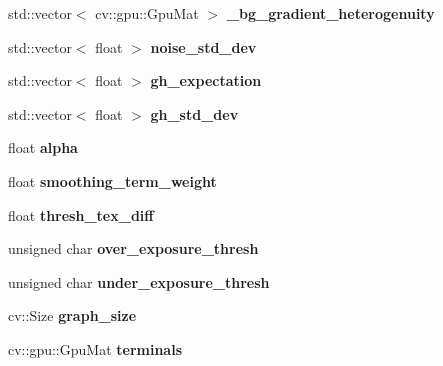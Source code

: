 \begin{DoxyCompactItemize}
std\+::vector$<$ cv\+::gpu\+::\+Gpu\+Mat $>$ {\bfseries \+\_\+bg\+\_\+gradient\+\_\+heterogenuity}
\item 
\hypertarget{classskl_1_1gpu_1_1_tex_cut_aa661cd66555f522bff787aaca52c354b}{}\label{classskl_1_1gpu_1_1_tex_cut_aa661cd66555f522bff787aaca52c354b} 
std\+::vector$<$ float $>$ {\bfseries noise\+\_\+std\+\_\+dev}
\item 
\hypertarget{classskl_1_1gpu_1_1_tex_cut_a4813022abf9a9f4305f7b73527f6b514}{}\label{classskl_1_1gpu_1_1_tex_cut_a4813022abf9a9f4305f7b73527f6b514} 
std\+::vector$<$ float $>$ {\bfseries gh\+\_\+expectation}
\item 
\hypertarget{classskl_1_1gpu_1_1_tex_cut_ab741d9765e1899ab326795b940f6a618}{}\label{classskl_1_1gpu_1_1_tex_cut_ab741d9765e1899ab326795b940f6a618} 
std\+::vector$<$ float $>$ {\bfseries gh\+\_\+std\+\_\+dev}
\item 
\hypertarget{classskl_1_1gpu_1_1_tex_cut_a5600fc961ecda5a4527bfc4bdecc0d4b}{}\label{classskl_1_1gpu_1_1_tex_cut_a5600fc961ecda5a4527bfc4bdecc0d4b} 
float {\bfseries alpha}
\item 
\hypertarget{classskl_1_1gpu_1_1_tex_cut_a40fa380adc2ccd67a56219d3796e5b8d}{}\label{classskl_1_1gpu_1_1_tex_cut_a40fa380adc2ccd67a56219d3796e5b8d} 
float {\bfseries smoothing\+\_\+term\+\_\+weight}
\item 
\hypertarget{classskl_1_1gpu_1_1_tex_cut_aa7a35234ff57bb949ef19aac21830481}{}\label{classskl_1_1gpu_1_1_tex_cut_aa7a35234ff57bb949ef19aac21830481} 
float {\bfseries thresh\+\_\+tex\+\_\+diff}
\item 
\hypertarget{classskl_1_1gpu_1_1_tex_cut_ab48e26d5aa9049d6b9cd54f3fb155cef}{}\label{classskl_1_1gpu_1_1_tex_cut_ab48e26d5aa9049d6b9cd54f3fb155cef} 
unsigned char {\bfseries over\+\_\+exposure\+\_\+thresh}
\item 
\hypertarget{classskl_1_1gpu_1_1_tex_cut_ad21505b70952f3ff98185d9b188ece6e}{}\label{classskl_1_1gpu_1_1_tex_cut_ad21505b70952f3ff98185d9b188ece6e} 
unsigned char {\bfseries under\+\_\+exposure\+\_\+thresh}
\item 
\hypertarget{classskl_1_1gpu_1_1_tex_cut_ab8a34fbea50d34ada65866e9cad5cd4e}{}\label{classskl_1_1gpu_1_1_tex_cut_ab8a34fbea50d34ada65866e9cad5cd4e} 
cv\+::\+Size {\bfseries graph\+\_\+size}
\item 
\hypertarget{classskl_1_1gpu_1_1_tex_cut_a907def0c22b5f5b74d237054827947fa}{}\label{classskl_1_1gpu_1_1_tex_cut_a907def0c22b5f5b74d237054827947fa} 
cv\+::gpu\+::\+Gpu\+Mat {\bfseries terminals}
\item 
\hypertarget{classskl_1_1gpu_1_1_tex_cut_a21b3938b975bb21e22c700390bc0697b}{}\label{classskl_1_1gpu_1_1_tex_cut_a21b3938b975bb21e22c700390bc0697b} 

\end{DoxyCompactItemize}
